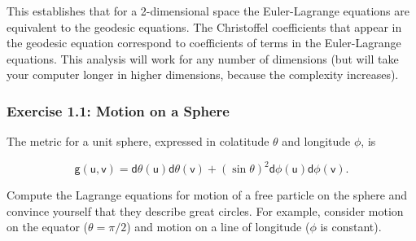 \documentclass[11pt]{article}
\begin{document}
This establishes that for a 2-dimensional space the Euler-Lagrange equations
are equivalent to the geodesic equations. The Christoffel coefficients that
appear in the geodesic equation correspond to coefficients of terms in the
Euler-Lagrange equations. This analysis will work for any number of
dimensions (but will take your computer longer in higher dimensions, because
the complexity increases).

\subsubsection{Exercise 1.1: Motion on a Sphere}
\label{sec:org3b8e529}

The metric for a unit sphere, expressed in colatitude \(\theta\) and longitude
\(\phi\), is

\begin{equation}
\mathsf{g}(\mathsf{u}, \mathsf{v})= \mathsf{d}\theta(\mathsf{u})\mathsf{d}\theta(\mathsf{v}) + (\sin \theta)^{2} \mathsf{d}\phi(\mathsf{u}) \mathsf{d} \phi(\mathsf{v}).
\end{equation}

Compute the Lagrange equations for motion of a free particle on the sphere
and convince yourself that they describe great circles. For example, consider
motion on the equator (\(\theta = \pi/2\)) and motion on a line of longitude
(\(\phi\) is constant).
\end{document}
